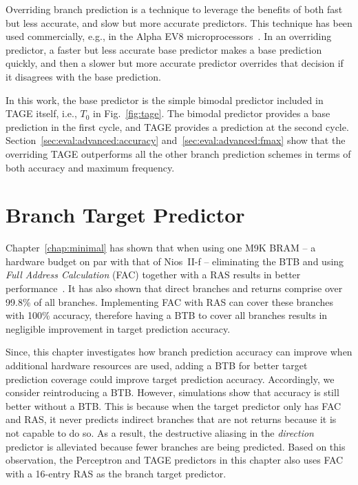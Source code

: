 Overriding branch prediction is a technique to leverage the benefits of both fast but less accurate, and slow but more accurate predictors. This technique has been used commercially, e.g., in the Alpha EV8 microprocessors~\cite{alphaEV8}. In an overriding predictor, a faster but less accurate base predictor makes a base prediction quickly, and then a slower but more accurate predictor overrides that decision if it disagrees with the base prediction. 

In this work, the base predictor is the simple bimodal predictor included in TAGE itself, i.e., $T_0$ in Fig.~\ref{fig:tage}. The bimodal predictor provides a base prediction in the first cycle, and TAGE provides a prediction at the second cycle. Section~\ref{sec:eval:advanced:accuracy} and~\ref{sec:eval:advanced:fmax} show that the overriding TAGE outperforms all the other branch prediction schemes in terms of both accuracy and maximum frequency.



\section{Branch Target Predictor}
\label{sec:advanced:target}
Chapter~\ref{chap:minimal} has shown that when using one M9K BRAM -- a hardware budget on par with that of Nios~II-f -- eliminating the BTB and using \textit{Full Address Calculation} (FAC) together with a RAS results in better performance~\cite{grselect}. It has also shown that direct branches and returns comprise over 99.8\% of all branches. Implementing FAC with RAS can cover these branches with 100\% accuracy, therefore having a BTB to cover all branches results in negligible improvement in target prediction accuracy.

Since, this chapter investigates how branch prediction accuracy can improve when additional hardware resources are used, adding a BTB for better target prediction coverage could improve target prediction accuracy. Accordingly, we consider reintroducing a BTB. However, simulations show that accuracy is still better without a BTB. This is because when the target predictor only has FAC and RAS, it never predicts indirect branches that are not returns because it is not capable to do so. As a result, the destructive aliasing in the \textit{direction} predictor is alleviated because fewer branches are being predicted. Based on this observation, the Perceptron and TAGE predictors in this chapter also uses FAC with a 16-entry RAS as the branch target predictor.



